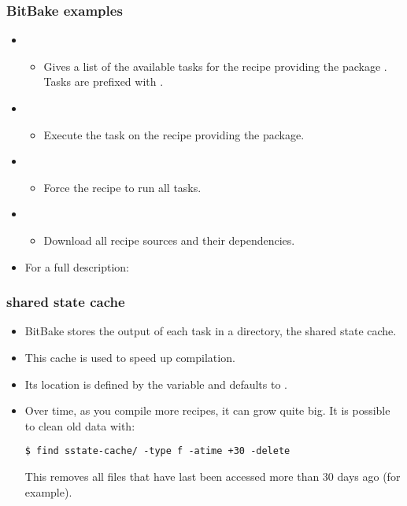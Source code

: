 \begin{frame}
  \frametitle{BitBake examples}
  \begin{itemize}
    \item {}
    \begin{itemize}
      \item Gives a list of the available tasks for the recipe
        providing the package . Tasks are
        prefixed with .
    \end{itemize}
    \item {}
    \begin{itemize}
      \item Execute the task  on the recipe providing
        the  package.
    \end{itemize}
    \item {}
    \begin{itemize}
      \item Force the  recipe to run all tasks.
    \end{itemize}
    \item {}
    \begin{itemize}
      \item Download all recipe sources and their dependencies.
    \end{itemize}
    \item For a full description: 
  \end{itemize}
\end{frame}

\begin{frame}[fragile]
  \frametitle{shared state cache}
  \begin{itemize}
    \item BitBake stores the output of each task in a directory, the
      shared state cache.
    \item This cache is used to speed up compilation.
    \item Its location is defined by the  variable and
      defaults to .
    \item Over time, as you compile more recipes, it can grow quite
      big. It is possible to clean old data with:
      \begin{block}{}
      \begin{verbatim}
$ find sstate-cache/ -type f -atime +30 -delete
      \end{verbatim}
      \end{block}
      This removes all files that have last been accessed more than 30 days ago
      (for example).
  \end{itemize}
\end{frame}

